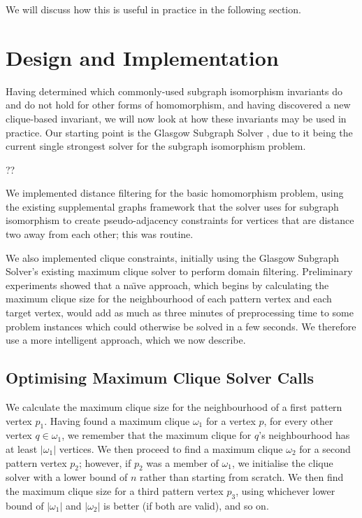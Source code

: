 \documentclass{article}
\begin{document}
We will discuss how this is useful in practice in the following section.

\section{Design and Implementation}

Having determined which commonly-used subgraph isomorphism invariants do and do not hold for other
forms of homomorphism, and having discovered a new clique-based invariant, we will now look at how
these invariants may be used in practice. Our starting point is the Glasgow Subgraph Solver
\cite{DBLP:conf/gg/McCreeshP020}, due to it being the current single strongest solver for the
subgraph isomorphism problem.

??

We implemented distance filtering for the basic homomorphism problem, using
the existing supplemental graphs framework that the solver uses for subgraph isomorphism to create
pseudo-adjacency constraints for vertices that are distance two away from each other; this was
routine.

We also implemented clique constraints, initially using the Glasgow Subgraph Solver's existing
maximum clique solver to perform domain filtering. Preliminary experiments showed that a na{\"\i}ve
approach, which begins by calculating the maximum clique size for the neighbourhood of each pattern
vertex and each target vertex, would add as much as three minutes of preprocessing time to some
problem instances which could otherwise be solved in a few seconds. We therefore use a more
intelligent approach, which we now describe.

\subsection{Optimising Maximum Clique Solver Calls}

We calculate the maximum clique size for the neighbourhood of a first pattern vertex $p_1$.  Having
found a maximum clique $\omega_1$ for a vertex $p$, for every other vertex $q \in \omega_1$, we
remember that the maximum clique for $q$'s neighbourhood has at least $|\omega_1|$ vertices. We then
proceed to find a maximum clique $\omega_2$ for a second pattern vertex $p_2$; however, if $p_2$ was
a member of $\omega_1$, we initialise the clique solver with a lower bound of $n$ rather than
starting from scratch. We then find the maximum clique size for a third pattern vertex $p_3$, using
whichever lower bound of $|\omega_1|$ and $|\omega_2|$ is better (if both are valid), and so on.
\end{document}
